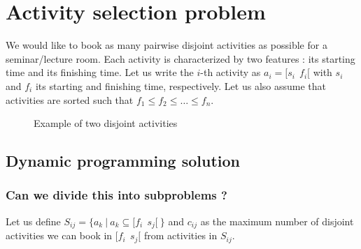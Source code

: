 \section{Activity selection problem} 
We would like to book as many pairwise disjoint activities as possible for a seminar/lecture room.
Each activity is characterized by two features : its starting time and its finishing time. Let us write the $i$-th activity as $a_i = [s_i \: \:  f_i[$ with $s_i$ and $f_i$ its starting and finishing time, respectively. Let us also assume that activities are sorted such that $f_1 \leq f_2 \leq \ldots \leq f_n$.

\begin{figure}[h!]
\centering
{}
\caption{Example of two disjoint activities}
\end{figure}

\subsection{Dynamic programming solution}
\subsubsection{Can we divide this into subproblems ?}

Let us define $S_{ij} = \{ a_k \: | \: a_k \subseteq [f_i \: \: s_j [ \: \}$ and $c_{ij}$ as the maximum number of disjoint activities we can book in $[f_i \: \: s_j [$  from activities in $S_{ij}$.

